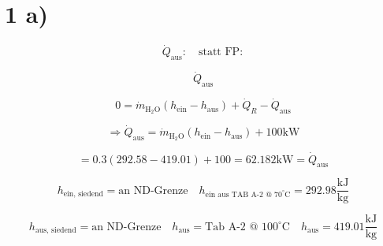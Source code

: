 \section*{1 a)}

\[
\dot{Q}_{\text{aus}}: \quad \text{statt FP}:
\]

\[
\dot{Q}_{\text{aus}}
\]


\[
0 = \dot{m}_{\text{H}_2\text{O}} (h_{\text{ein}} - h_{\text{aus}}) + \dot{Q}_R - \dot{Q}_{\text{aus}}
\]

\[
\Rightarrow \dot{Q}_{\text{aus}} = \dot{m}_{\text{H}_2\text{O}} (h_{\text{ein}} - h_{\text{aus}}) + 100 \text{kW}
\]

\[
= 0.3 \left( 292.58 - 419.01 \right) + 100 = 62.182 \text{kW} = \dot{Q}_{\text{aus}}
\]

\[
h_{\text{ein, siedend}} = \text{an ND-Grenze} \quad h_{\text{ein aus TAB A-2 @ 70}^\circ \text{C}} = 292.98 \frac{\text{kJ}}{\text{kg}}
\]

\[
h_{\text{aus, siedend}} = \text{an ND-Grenze} \quad h_{\text{aus}} = \text{Tab A-2 @ 100}^\circ \text{C} \quad h_{\text{aus}} = 419.01 \frac{\text{kJ}}{\text{kg}}
\]